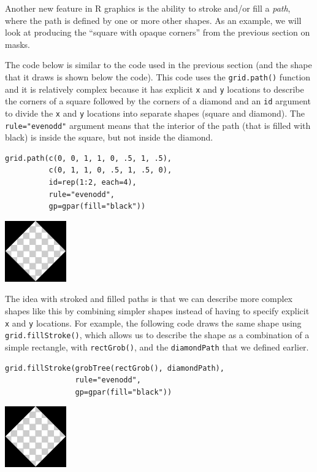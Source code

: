 Another new feature in R graphics is the ability to stroke and/or fill
a \emph{path}, where the path is defined by one or more other shapes.
As an example, we will look at producing the ``square with opaque corners''
from the previous section on masks.

The code below is similar to the code used in the previous section
(and the shape that it draws is shown below the code).
This code uses the \texttt{grid.path()} function and it is relatively complex
because it has explicit \texttt{x} and \texttt{y} locations to describe the corners of
a square followed by the corners of a diamond and an \texttt{id} argument
to divide the \texttt{x} and \texttt{y} locations into separate shapes (square and diamond).
The \texttt{rule="evenodd"} argument means that the interior of the path
(that is filled with black) is inside the square, but not inside the diamond.

\begin{verbatim}
grid.path(c(0, 0, 1, 1, 0, .5, 1, .5),
          c(0, 1, 1, 0, .5, 1, .5, 0),
          id=rep(1:2, each=4),
          rule="evenodd",
          gp=gpar(fill="black"))
\end{verbatim}

\includegraphics{murrell-definitions-2023_files/figure-latex/unnamed-chunk-23-1.png}

The idea with stroked and filled paths is that we can describe more
complex shapes like this by combining simpler shapes instead
of having to specify explicit \texttt{x} and \texttt{y} locations.
For example, the following code draws the same shape using
\texttt{grid.fillStroke()}, which allows us to describe the shape as a
combination of a simple rectangle, with \texttt{rectGrob()},
and the \texttt{diamondPath} that we defined
earlier.

\begin{verbatim}
grid.fillStroke(grobTree(rectGrob(), diamondPath),
                rule="evenodd",
                gp=gpar(fill="black"))
\end{verbatim}

\includegraphics{murrell-definitions-2023_files/figure-latex/unnamed-chunk-24-1.png}

